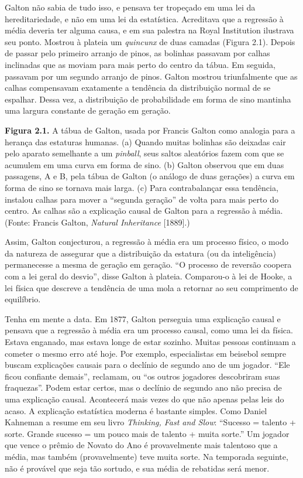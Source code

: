 \documentclass[11pt,a5paper,twoside]{book}
\begin{document}
Galton não sabia de tudo isso, e pensava ter tropeçado em uma lei da hereditariedade, e não em uma lei da estatística. Acreditava que a regressão à média deveria ter alguma causa, e em sua palestra na Royal Institution ilustrava seu ponto. Mostrou à plateia um \textit{quincunx} de duas camadas (Figura 2.1). Depois de passar pelo primeiro arranjo de pinos, as bolinhas passavam por calhas inclinadas que as moviam para mais perto do centro da tábua. Em seguida, passavam por um segundo arranjo de pinos. Galton mostrou triunfalmente que as calhas compensavam exatamente a tendência da distribuição normal de se espalhar. Dessa vez, a distribuição de probabilidade em forma de sino mantinha uma largura constante de geração em geração.

\textbf{Figura 2.1.} A tábua de Galton, usada por Francis Galton como analogia para a herança das estaturas humanas. (a) Quando muitas bolinhas são deixadas cair pelo aparato semelhante a um \textit{pinball}, seus saltos aleatórios fazem com que se acumulem em uma curva em forma de sino. (b) Galton observou que em duas passagens, A e B, pela tábua de Galton (o análogo de duas gerações) a curva em forma de sino se tornava mais larga. (c) Para contrabalançar essa tendência, instalou calhas para mover a “segunda geração” de volta para mais perto do centro. As calhas são a explicação causal de Galton para a regressão à média. (Fonte: Francis Galton, \textit{Natural Inheritance} [1889].)

Assim, Galton conjecturou, a regressão à média era um processo físico, o modo da natureza de assegurar que a distribuição da estatura (ou da inteligência) permanecesse a mesma de geração em geração. “O processo de reversão coopera com a lei geral do desvio”, disse Galton à plateia. Comparou-o à lei de Hooke, a lei física que descreve a tendência de uma mola a retornar ao seu comprimento de equilíbrio.

Tenha em mente a data. Em 1877, Galton perseguia uma explicação causal e pensava que a regressão à média era um processo causal, como uma lei da física. Estava enganado, mas estava longe de estar sozinho. Muitas pessoas continuam a cometer o mesmo erro até hoje. Por exemplo, especialistas em beisebol sempre buscam explicações causais para o declínio de segundo ano de um jogador. “Ele ficou confiante demais”, reclamam, ou “os outros jogadores descobriram suas fraquezas”. Podem estar certos, mas o declínio de segundo ano não precisa de uma explicação causal. Acontecerá mais vezes do que não apenas pelas leis do acaso. A explicação estatística moderna é bastante simples. Como Daniel Kahneman a resume em seu livro \textit{Thinking, Fast and Slow}: “Sucesso = talento + sorte. Grande sucesso = um pouco mais de talento + muita sorte.” Um jogador que vence o prêmio de Novato do Ano é provavelmente mais talentoso que a média, mas também (provavelmente) teve muita sorte. Na temporada seguinte, não é provável que seja tão sortudo, e sua média de rebatidas será menor.
\end{document}
